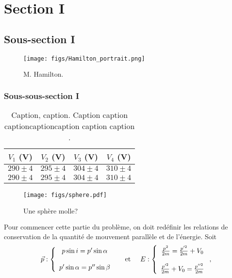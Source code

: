 \section{Section I} \label{sec: sec_1_1}
\blindtext[4]\cite{texbook}

\subsection{Sous-section I} \label{subsec: sub_1_1}
\begin{wrapfigure}{r}{0.4\textwidth}
    \centering
    \texttt{[image: figs/Hamilton\_portrait.png]}
    \caption{M. Hamilton.\cite{texbook}}
    \label{fig: hamilton_portrait}
\end{wrapfigure}
\blindtext[4]\cite{latex:companion}

\subsubsection{Sous-sous-section I} \label{subsubsec: subsub_1_1}
\blindtext\cite{latex2e}

\begin{table}[h!]
    \centering
    \begin{tabular}{cccc} \toprule
        $V_1$ (V) & $V_2$ (V) & $V_3$ (V) & $V_4$ (V) \\\midrule\midrule
        $290 \pm 4$ & $295 \pm 4$ & $304 \pm 4$ & $310 \pm 4$ \\
        $290 \pm 4$ & $295 \pm 4$ & $304 \pm 4$ & $310 \pm 4$ \\
        \bottomrule
    \end{tabular}
    \caption{Caption, caption. Caption caption captioncaptioncaption caption caption
    .}
    \label{table: tableau_1.1.1}
\end{table}

\blindtext[3]

\begin{figure}[h!]
    \begin{center}
        \texttt{[image: figs/sphere.pdf]}
    \end{center}
    \caption{Une sphère molle?}
    \label{fig: oui_une_sphere}
\end{figure}

\noindent
Pour commencer cette partie du problème, on doit redéfinir les relations de conservation de la quantité de mouvement parallèle et de l'énergie. Soit
\begin{align*}
    \Vec{p}:
    \left\{
    \begin{array}{c}
        p\sin i = p'\sin\alpha \\\\
        p'\sin\alpha = p''\sin\beta
    \end{array}
    \right.
    \hspace{0.5cm}\text{et}\hspace{0.5cm}
    E:
    \left\{
    \begin{array}{c}
        \frac{p^2}{2m} = \frac{p'^2}{2m} + V_0 \\\\
        \frac{p'^2}{2m} + V_0 = \frac{p''^2}{2m}
    \end{array}
    \right.,
\end{align*}

